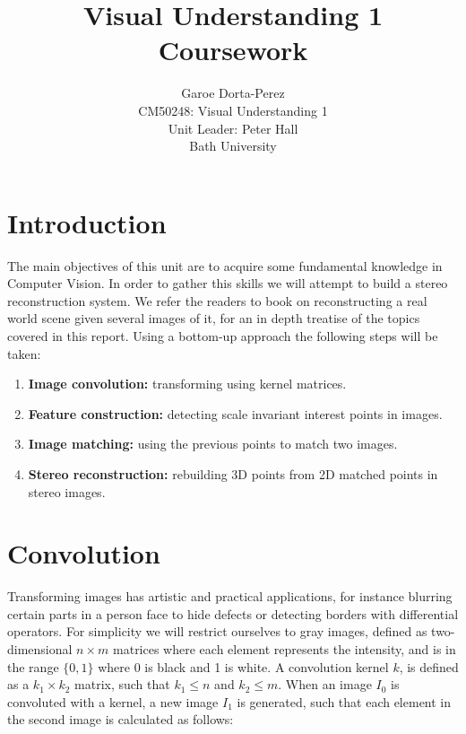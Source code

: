 \documentclass[12pt]{article}
\begin{document}
  
\title{Visual Understanding 1 Coursework}
\author{Garoe Dorta-Perez\\
CM50248: Visual Understanding 1\\
Unit Leader: Peter Hall\\
Bath University}
 
\maketitle
 
\section{Introduction}

The main objectives of this unit are to acquire some fundamental knowledge in Computer Vision.
In order to gather this skills we will attempt to build a stereo reconstruction system.
We refer the readers to \cite{Hartley2004} book on reconstructing a real world scene given several images of it, for an in depth treatise of the topics covered in this report.
Using a bottom-up approach the following steps will be taken:
\begin{enumerate}
\item \textbf{Image convolution:} transforming using kernel matrices.
\item \textbf{Feature construction:} detecting scale invariant interest points in images.
\item \textbf{Image matching:} using the previous points to match two images.
\item \textbf{Stereo reconstruction:} rebuilding 3D points from 2D matched points in stereo images.
\end{enumerate}

\section{Convolution}
\label{sec:convolution}

Transforming images has artistic and practical applications, for instance blurring certain parts in a person face to hide defects or detecting borders with differential operators.
For simplicity we will restrict ourselves to gray images, defined as two-dimensional $n \times m$ matrices where each element represents the intensity, and is in the range $\lbrace  0, 1 \rbrace$ where 0 is black and 1 is white.
A convolution kernel $k$, is defined as a $k_1 \times k_2$ matrix, such that $k_1 \leqslant n$ and $k_2 \leqslant m$.
When an image $I_0$ is convoluted with a kernel, a new image $I_1$ is generated, such that each element in the second image is calculated as follows:
\end{document}
